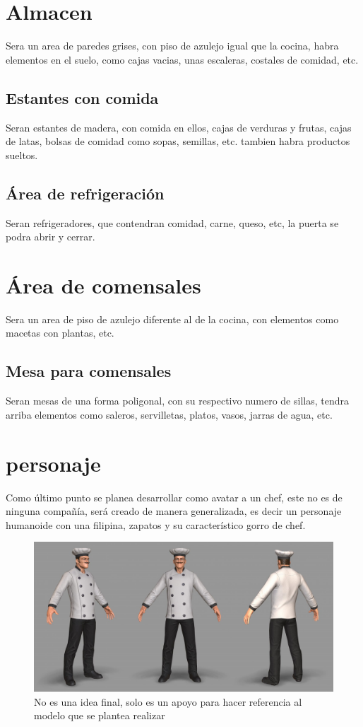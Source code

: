 \documentclass[letter,12pt]{article}
\begin{document}
\section{Almacen}
Sera un area de paredes grises, con piso de azulejo igual que la cocina, habra elementos en el suelo, como cajas vacias, unas escaleras, costales de comidad, etc.

\subsection{Estantes con comida}
Seran estantes de madera, con comida en ellos, cajas de verduras y frutas, cajas de latas, bolsas de comidad como sopas, semillas, etc. tambien habra productos sueltos.

\subsection{Área de refrigeración}
Seran refrigeradores, que contendran comidad, carne, queso, etc, la puerta se podra abrir y cerrar.

\section{Área de comensales}
Sera un area de piso de azulejo diferente al de la cocina, con elementos como macetas con plantas, etc.

\subsection{Mesa para comensales}
Seran mesas de una forma poligonal, con su respectivo numero de sillas, tendra arriba elementos como saleros, servilletas, platos, vasos, jarras de agua, etc.

\section{personaje}
Como último punto se planea desarrollar como avatar a un chef, este no es de ninguna compañía, será creado de manera generalizada, es decir un personaje humanoide con una filipina, zapatos y su característico gorro de chef.

	\begin{figure}[H]
		\includegraphics[scale=0.25]{img2}
		\centering
		\caption{No es una idea final, solo es un apoyo para hacer referencia al modelo que se plantea realizar}
	\end{figure}
\end{document}
